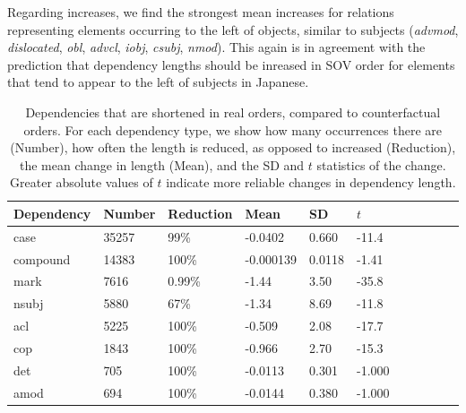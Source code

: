 \documentclass[11pt,a4paper]{article}
\begin{document}
Regarding increases, we find the strongest mean increases for relations representing elements occurring to the left of objects, similar to subjects (\emph{advmod}, \emph{dislocated}, \emph{obl}, \emph{advcl}, \emph{iobj}, \emph{csubj}, \emph{nmod}).
This again is in agreement with the prediction that dependency lengths should be inreased in SOV order for elements that tend to appear to the left of subjects in Japanese.

\begin{table}
\begin{center}
\begin{tabular}{l|llllllllll}
   Dependency  &Number &Reduction     &  Mean   &   SD &       $t$ \\ \hline
  case & 35257  &  99\% & -0.0402     &0.660  & -11.4   \\
 compound     &14383  &  100\%     & -0.000139   &0.0118 &  -1.41  \\ 
 mark  & 7616  &  0.99\% & -1.44       &3.50 &   -35.8   \\
  nsubj        & 5880  &  67\% & -1.34       &8.69  &  -11.8   \\
  acl          & 5225  &  100\%     & -0.509      &2.08  &  -17.7   \\
 cop   & 1843  &  100\%    &  -0.966      &2.70  &  -15.3   \\
 det          &  705  &  100\%    &  -0.0113     &0.301 &   -1.000 \\
 amod         &  694  &  100\%    &  -0.0144     &0.380 &   -1.000 \\
\end{tabular}
\end{center}
\caption{Dependencies that are shortened in real orders, compared to counterfactual orders. For each dependency type, we show how many occurrences there are (Number), how often the length is reduced, as opposed to increased (Reduction), the mean change in length (Mean), and the SD and $t$ statistics of the change. Greater absolute values of $t$ indicate more reliable changes in dependency length.}\label{fig:shortened}
\end{table}
\end{document}
